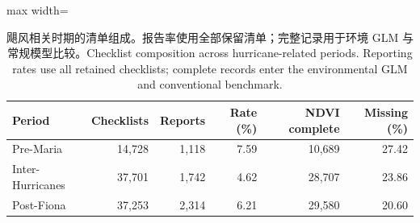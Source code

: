 \begin{table}[htbp]\centering\small
\caption{\ifzh 飓风相关时期的清单组成。报告率使用全部保留清单；完整记录用于环境 GLM 与常规模型比较。\else Checklist composition across hurricane-related periods. Reporting rates use all retained checklists; complete records enter the environmental GLM and conventional benchmark.\fi}\label{tab:periods}
\begin{adjustbox}{max width=\linewidth}
\begin{tabular}{lrrrrr}\toprule
Period & Checklists & Reports & Rate (\%) & NDVI complete & Missing (\%) \\
\midrule
Pre-Maria & 14,728 & 1,118 & 7.59 & 10,689 & 27.42 \\
Inter-Hurricanes & 37,701 & 1,742 & 4.62 & 28,707 & 23.86 \\
Post-Fiona & 37,253 & 2,314 & 6.21 & 29,580 & 20.60 \\
\bottomrule\end{tabular}
\end{adjustbox}
\end{table}
